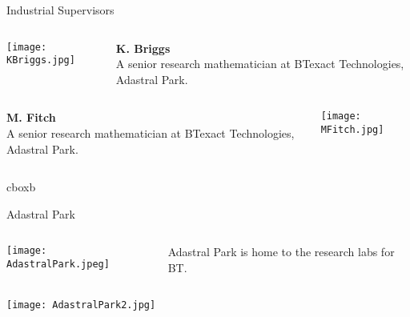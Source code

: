 \documentclass[final]{beamer}
\theoremstyle{plain}
\theoremstyle{definition}
\theoremstyle{remark}
\newlength{\onecolwid}
\begin{document}
\begin{frame}[t]
\begin{columns}[t]
\begin{column}{\onecolwid}
\begin{block}{Industrial Supervisors}
\vspace{-2cm}
\begin{columns}
\begin{column}{0.25\linewidth}
\texttt{[image: KBriggs.jpg]}
\end{column}
\begin{column}{0.75\linewidth}
\textbf{K. Briggs}
 \\
A senior research mathematician at BTexact Technologies, Adastral Park. \\
\end{column}
\end{columns}
\begin{columns}
\begin{column}{0.75\linewidth}
\textbf{M. Fitch}
 \\
A senior research mathematician at BTexact Technologies, Adastral Park. \\
\end{column}
\begin{column}{0.25\linewidth}
\texttt{[image: MFitch.jpg]}
\end{column}
\end{columns}
\end{block}
 \hspace{0.5in}
 \begin{beamercolorbox}[wd=10in,colsep=0.15cm]{cboxb}
 \end{beamercolorbox}
 \vspace{0.1in}



    \begin{mdframed}[backgroundcolor=white, userdefinedwidth=0.999999\linewidth]
    \centering
    \center
    \end{mdframed}
    \vspace{1.5cm}
\begin{block}{Adastral Park}
\begin{columns}
\begin{column}{0.5\linewidth}
\texttt{[image: AdastralPark.jpeg]} \\ \end{column}
\begin{column}{0.5\linewidth}
Adastral Park is home to the research labs for BT.
\end{column}
\end{columns}
 \vspace{1cm}
\texttt{[image: AdastralPark2.jpg]}
\end{block}


\end{column}
\end{columns}
\end{frame}
\end{document}
